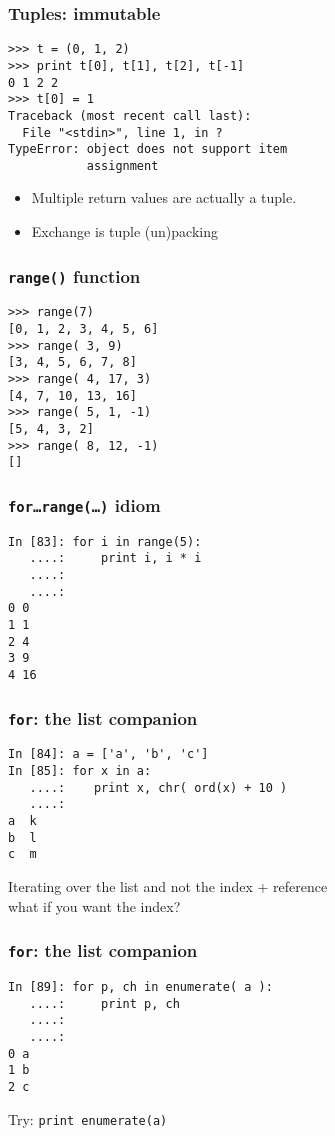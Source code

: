 \documentclass[14pt,compress]{beamer}
\newcounter{time}
\newcommand{\inctime}[1]{\addtocounter{time}{#1}{\tiny \thetime\ m}}
\newcommand{\typ}[1]{\texttt{#1}}
\begin{document}
\begin{frame}[fragile]
  \frametitle{Tuples: immutable}
\begin{lstlisting}
>>> t = (0, 1, 2)
>>> print t[0], t[1], t[2], t[-1] 
0 1 2 2
>>> t[0] = 1
Traceback (most recent call last):
  File "<stdin>", line 1, in ?
TypeError: object does not support item
           assignment
\end{lstlisting}  
\begin{itemize}
    \item Multiple return values are actually a tuple.
    \item Exchange is tuple (un)packing
\end{itemize}

\end{frame}

\begin{frame}[fragile]
  \frametitle{\typ{range()} function}
  \begin{lstlisting}
>>> range(7)
[0, 1, 2, 3, 4, 5, 6]
>>> range( 3, 9)
[3, 4, 5, 6, 7, 8]
>>> range( 4, 17, 3)
[4, 7, 10, 13, 16]
>>> range( 5, 1, -1)
[5, 4, 3, 2]
>>> range( 8, 12, -1)
[]
  \end{lstlisting}
\end{frame}

\begin{frame}[fragile]
  \frametitle{\typ{for\ldots range(\ldots)} idiom}
  \begin{lstlisting}
In [83]: for i in range(5):
   ....:     print i, i * i
   ....:     
   ....:     
0 0
1 1
2 4
3 9
4 16
\end{lstlisting}
\end{frame}

\begin{frame}[fragile]
  \frametitle{\typ{for}: the list companion}
  
  \begin{lstlisting}
In [84]: a = ['a', 'b', 'c']
In [85]: for x in a:
   ....:    print x, chr( ord(x) + 10 )
   ....:
a  k
b  l
c  m
  \end{lstlisting}
  Iterating over the list and not the index + reference\\
  what if you want the index?
\end{frame}

\begin{frame}[fragile]
  \frametitle{\typ{for}: the list companion}
  \begin{lstlisting}
In [89]: for p, ch in enumerate( a ):
   ....:     print p, ch
   ....:     
   ....:     
0 a
1 b
2 c
  \end{lstlisting}
Try: \typ{print enumerate(a)}
\inctime{20}
\end{frame}
\end{document}
